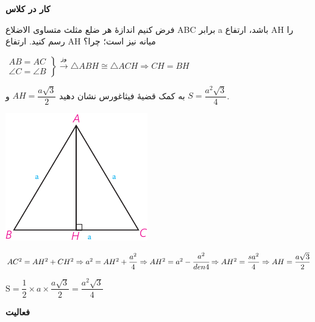 \documentclass[12pt, a4paper, twoside]{book}
\begin{document}
\bigskip

\textbf{کار در کلاس}

\begin{minipage}{0.7\textwidth}
	فرض کنیم اندازهٔ هر ضلع مثلث متساوی الاضلاع ABC برابر a باشد، ارتفاع AH را رسم کنید. ارتفاع AH میانه نیز است؛ چرا؟
	\begin{flushleft}
		$
	\left.
	\begin{array}{ccc}
		AB = AC \\
		\angle C = \angle B
	\end{array}
	\right\}
	\xrightarrow{\mbox{وز}} \triangle ABH \cong \triangle ACH \Rightarrow CH = BH
	$
	\end{flushleft}
	به کمک قضیهٔ فیثاغورس نشان دهید 
	$AH = \dfrac{a\sqrt{3}}2$
	و 
	$S = \dfrac{a^2 \sqrt{3}}{4}$.
\end{minipage}
\begin{minipage}{0.25\textwidth}
	\begin{flushleft}
		\includegraphics{"Shapes/Fasl - 3/Dars 2/P65-S3"}
	\end{flushleft}
\end{minipage}

	\begin{flushleft}
	$
	AC^2 = AH^2 + CH^2 \Rightarrow a^2 = AH^2 + \dfrac{a^2}{4} \Rightarrow AH^2 = a^2 - \cfrac{a^2}{den4} \Rightarrow AH^2 = \dfrac{sa^2}{4} \Rightarrow AH = \dfrac{a\sqrt{3}}{2}
	$
	
	$
	\text{S} = \dfrac12 \times a \times \dfrac{a\sqrt{3}}{2} = \dfrac{a^2\sqrt{3}}{4}
	$
\end{flushleft}


\bigskip

\textbf{فعالیت}
\end{document}
